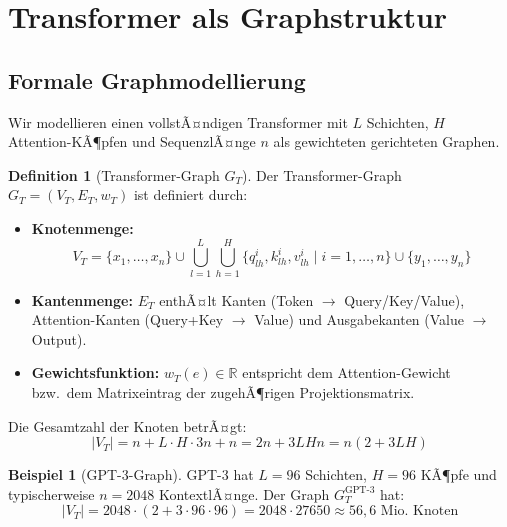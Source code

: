 ﻿\documentclass[a4paper,12pt]{article}
\theoremstyle{definition}
\newtheorem{definition}{Definition}
\newtheorem{beispiel}{Beispiel}
\begin{document}
\section{Transformer als Graphstruktur}

\subsection{Formale Graphmodellierung}

Wir modellieren einen vollstÃ¤ndigen Transformer mit $L$ Schichten, $H$
Attention-KÃ¶pfen und SequenzlÃ¤nge $n$ als gewichteten gerichteten Graphen.

\begin{definition}[Transformer-Graph $G_T$]
	Der Transformer-Graph $G_T = (V_T, E_T, w_T)$ ist definiert durch:
	\begin{itemize}
		\item \textbf{Knotenmenge:}
		\[
		V_T = \{x_1,\ldots,x_n\} \cup \bigcup_{l=1}^{L}\bigcup_{h=1}^{H}
		\{q_{lh}^i, k_{lh}^i, v_{lh}^i \mid i=1,\ldots,n\}
		\cup \{y_1,\ldots,y_n\}
		\]
		\item \textbf{Kantenmenge:} $E_T$ enthÃ¤lt Kanten
		      (Token $\to$ Query/Key/Value), Attention-Kanten
		      (Query+Key $\to$ Value) und Ausgabekanten (Value $\to$ Output).
		\item \textbf{Gewichtsfunktion:} $w_T(e) \in \mathbb{R}$ entspricht
		      dem Attention-Gewicht bzw.\ dem Matrixeintrag der zugehÃ¶rigen
		      Projektionsmatrix.
	\end{itemize}
\end{definition}

Die Gesamtzahl der Knoten betrÃ¤gt:
\[
|V_T| = n + L \cdot H \cdot 3n + n = 2n + 3LHn = n(2 + 3LH)
\]

\begin{beispiel}[GPT-3-Graph]
	GPT-3 hat $L = 96$ Schichten, $H = 96$ KÃ¶pfe und typischerweise
	$n = 2048$ KontextlÃ¤nge. Der Graph $G_{T}^{\mathrm{GPT\text{-}3}}$ hat:
	\[
	|V_T| = 2048 \cdot (2 + 3 \cdot 96 \cdot 96) = 2048 \cdot 27650 \approx 56{,}6 \text{ Mio.\ Knoten}
	\]
\end{beispiel}
\end{document}
